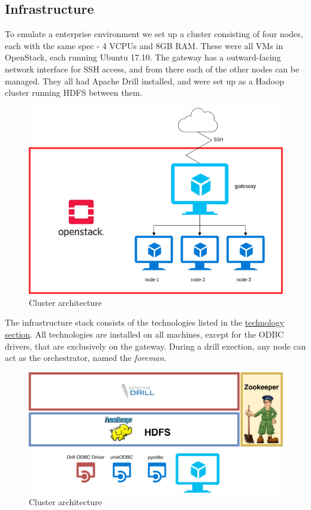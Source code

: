 \documentclass[a4paper,english]{report}
\begin{document}
			\subsection{Infrastructure}
				To emulate a enterprise environment we set up a cluster consisting of four nodes, each with the same spec - 4 VCPUs and 8GB RAM. These were all VMs in OpenStack, each running Ubuntu 17.10. The gateway has a outward-facing network interface for SSH access, and from there each of the other nodes can be managed. They all had Apache Drill installed, and were set up as a Hadoop cluster running HDFS between them.
				\begin{figure}[h]
					\includegraphics[width=\textwidth]{cluster}
					\caption{Cluster architecture}
				\end{figure}
				The infrastructure stack consists of the technologies listed in the \hyperref[technology]{technology section}. All technologies are installed on all machines, except for the ODBC drivers, that are exclusively on the gateway. During a drill exection, any node can act as the orchestrator, named the \textit{foreman}.
				\begin{figure}[h]
					\includegraphics[width=\textwidth]{tech_stack}
					\caption{Cluster architecture}
				\end{figure}
\end{document}
